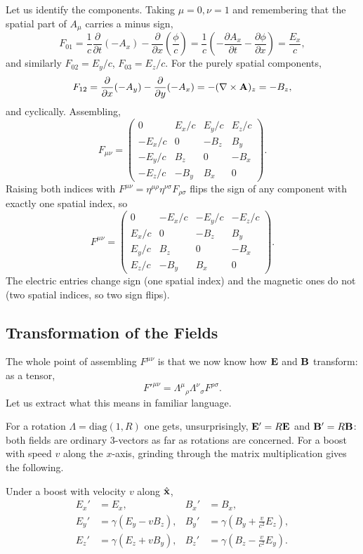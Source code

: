 \documentclass[a4paper]{scrartcl}
\newcommand{\hh}[1]{\hat{\vv{#1}}}
\begin{document}
Let us identify the components. Taking $\mu = 0, \nu = 1$ and remembering that the spatial part of $A_\mu$ carries a minus sign,
$$
F_{01} = \frac{1}{c}\frac{\partial}{\partial t}(-A_x) - \frac{\partial}{\partial x}\left(\frac{\phi}{c}\right) = \frac{1}{c}\left(-\frac{\partial A_x}{\partial t} - \frac{\partial \phi}{\partial x}\right) = \frac{E_x}{c},
$$
and similarly $F_{02} = E_y/c$, $F_{03} = E_z/c$. For the purely spatial components,
$$
F_{12} = \frac{\partial}{\partial x}(-A_y) - \frac{\partial}{\partial y}(-A_x) = -(\nabla\times\mathbf{A})_z = -B_z,
$$
and cyclically. Assembling,
$$
F_{\mu\nu} = \begin{pmatrix} 0 & E_x/c & E_y/c & E_z/c\\ -E_x/c & 0 & -B_z & B_y\\ -E_y/c & B_z & 0 & -B_x\\ -E_z/c & -B_y & B_x & 0\end{pmatrix}.
$$
Raising both indices with $F^{\mu\nu} = \eta^{\mu\rho}\eta^{\nu\sigma}F_{\rho\sigma}$ flips the sign of any component with exactly one spatial index, so
$$
F^{\mu\nu} = \begin{pmatrix} 0 & -E_x/c & -E_y/c & -E_z/c\\ E_x/c & 0 & -B_z & B_y\\ E_y/c & B_z & 0 & -B_x\\ E_z/c & -B_y & B_x & 0\end{pmatrix}.
$$
The electric entries change sign (one spatial index) and the magnetic ones do not (two spatial indices, so two sign flips).

\subsection{Transformation of the Fields}

The whole point of assembling $F^{\mu\nu}$ is that we now know how $\mathbf{E}$ and $\mathbf{B}$ transform: as a tensor,
$$
F'^{\mu\nu} = \Lambda^\mu{}_\rho \Lambda^\nu{}_\sigma F^{\rho\sigma}.
$$
Let us extract what this means in familiar language.

For a rotation $\Lambda = \mathrm{diag}(1,R)$ one gets, unsurprisingly, $\mathbf{E}' = R\mathbf{E}$ and $\mathbf{B}' = R\mathbf{B}$: both fields are ordinary 3-vectors as far as rotations are concerned. For a boost with speed $v$ along the $x$-axis, grinding through the matrix multiplication gives the following.

\begin{proposition}
	Under a boost with velocity $v$ along $\hh{x}$,
	\begin{align*}
		E_x' &= E_x, & B_x' &= B_x,\\
		E_y' &= \gamma(E_y - vB_z), & B_y' &= \gamma\left(B_y + \frac{v}{c^2}E_z\right),\\
		E_z' &= \gamma(E_z + vB_y), & B_z' &= \gamma\left(B_z - \frac{v}{c^2}E_y\right).
	\end{align*}
\end{proposition}
\end{document}
